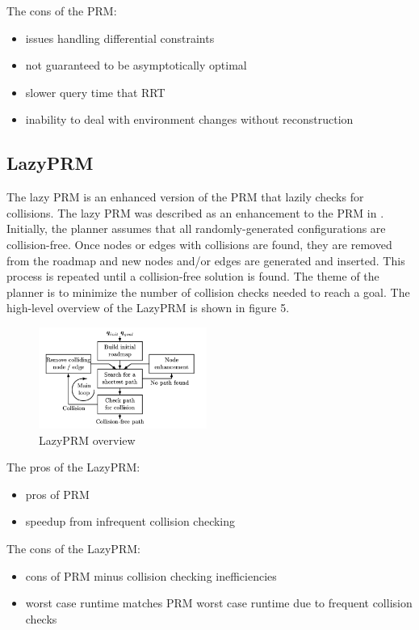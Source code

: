 \documentclass[conference]{IEEEtran} \usepackage[T1]{fontenc} \usepackage[backend=biber, style=ieee]{biblatex}
\begin{document}
The cons of the PRM:
\begin{itemize}
\item issues handling differential constraints
\item not guaranteed to be asymptotically optimal
\item slower query time that RRT
\item inability to deal with environment changes without reconstruction
\end{itemize}

\subsection{LazyPRM} \label{LazyPRM}
The lazy PRM is an enhanced version of the PRM that lazily checks for collisions. The lazy PRM was described as an enhancement to the PRM in \cite{lazy_prm}. Initially, 
the planner assumes that all randomly-generated configurations are collision-free. Once nodes or edges with collisions are found, they are removed from the roadmap and
new nodes and/or edges are generated and inserted. This process is repeated until a collision-free solution is found. The theme of the planner is to minimize the number
of collision checks needed to reach a goal. The high-level overview of the LazyPRM is shown in figure 5.

\begin{figure}
\label{figure5} 
\centering 
\includegraphics[width=0.49\textwidth]{lazy_prm}
\caption{LazyPRM overview}
\end{figure}

The pros of the LazyPRM:
\begin{itemize}
\item pros of PRM
\item speedup from infrequent collision checking
\end{itemize}

The cons of the LazyPRM:
\begin{itemize}
\item cons of PRM minus collision checking inefficiencies
\item worst case runtime matches PRM worst case runtime due to frequent collision checks
\end{itemize}
\end{document}
